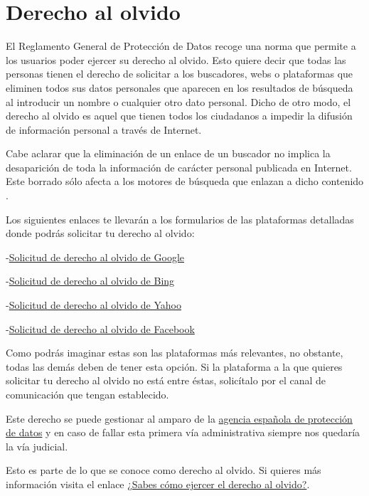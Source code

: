 \documentclass[
  a4paper,
  openany]{book}
\begin{document}
\hypertarget{derecho-al-olvido}{%
\section{Derecho al olvido}\label{derecho-al-olvido}}

El Reglamento General de Protección de Datos recoge una norma que permite a los usuarios poder ejercer su derecho al olvido. Esto quiere decir que todas las personas tienen el derecho de solicitar a los buscadores, webs o plataformas que eliminen todos sus datos personales que aparecen en los resultados de búsqueda al introducir un nombre o cualquier otro dato personal. Dicho de otro modo, el derecho al olvido es aquel que tienen todos los ciudadanos a impedir la difusión de información personal a través de Internet.

Cabe aclarar que la eliminación de un enlace de un buscador no implica la desaparición de toda la información de carácter personal publicada en Internet. Este borrado sólo afecta a los motores de búsqueda que enlazan a dicho contenido \citep{OSI-derecho-al-olvido}.

Los siguientes enlaces te llevarán a los formularios de las plataformas detalladas donde podrás solicitar tu derecho al olvido:

-\href{https://support.google.com/websearch/troubleshooter/3111061?hl=es}{Solicitud de derecho al olvido de Google}

-\href{https://help.bing.microsoft.com/\#apex/18/ES/10013/-1/ES}{Solicitud de derecho al olvido de Bing}

-\href{https://es-us.ayuda.yahoo.com/kb/Eliminaci\%C3\%B3n-de-resultados-de-b\%C3\%BAsqueda-de-Yahoo-Search-sln4530.html}{Solicitud de derecho al olvido de Yahoo}

-\href{https://www.facebook.com/help/217091804975136}{Solicitud de derecho al olvido de Facebook}

Como podrás imaginar estas son las plataformas más relevantes, no obstante, todas las demás deben de tener esta opción. Si la plataforma a la que quieres solicitar tu derecho al olvido no está entre éstas, solicítalo por el canal de comunicación que tengan establecido.

Este derecho se puede gestionar al amparo de la \href{https://www.aepd.es/es/areas-de-actuacion/internet-y-redes-sociales/derecho-al-olvido}{agencia española de protección de datos} y en caso de fallar esta primera vía administrativa siempre nos quedaría la vía judicial.

Esto es parte de lo que se conoce como derecho al olvido. Si quieres más información visita el enlace \href{https://www.osi.es/es/actualidad/blog/2018/09/19/sabes-como-ejercer-el-derecho-al-olvido}{¿Sabes cómo ejercer el derecho al olvido?}.
\end{document}
